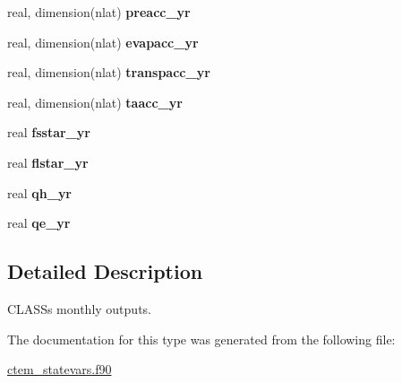 \begin{DoxyCompactItemize}
\item 
\hypertarget{structctem__statevars_1_1class__moyr__output_a426a91fcbee45b31d218c7f011e33e40}{}real, dimension(nlat) {\bfseries preacc\+\_\+yr}\label{structctem__statevars_1_1class__moyr__output_a426a91fcbee45b31d218c7f011e33e40}

\item 
\hypertarget{structctem__statevars_1_1class__moyr__output_aa49169490b0d581692a98c33a5bd30a2}{}real, dimension(nlat) {\bfseries evapacc\+\_\+yr}\label{structctem__statevars_1_1class__moyr__output_aa49169490b0d581692a98c33a5bd30a2}

\item 
\hypertarget{structctem__statevars_1_1class__moyr__output_a11a459fedcae713c3ef02f96f890aba6}{}real, dimension(nlat) {\bfseries transpacc\+\_\+yr}\label{structctem__statevars_1_1class__moyr__output_a11a459fedcae713c3ef02f96f890aba6}

\item 
\hypertarget{structctem__statevars_1_1class__moyr__output_afc23c698dded3c479a69cabd2fc35bf9}{}real, dimension(nlat) {\bfseries taacc\+\_\+yr}\label{structctem__statevars_1_1class__moyr__output_afc23c698dded3c479a69cabd2fc35bf9}

\item 
\hypertarget{structctem__statevars_1_1class__moyr__output_a61b7693efdd7d3aa645b143d9c98994e}{}real {\bfseries fsstar\+\_\+yr}\label{structctem__statevars_1_1class__moyr__output_a61b7693efdd7d3aa645b143d9c98994e}

\item 
\hypertarget{structctem__statevars_1_1class__moyr__output_a2c170085a3fee4ca9d79a13916077ee0}{}real {\bfseries flstar\+\_\+yr}\label{structctem__statevars_1_1class__moyr__output_a2c170085a3fee4ca9d79a13916077ee0}

\item 
\hypertarget{structctem__statevars_1_1class__moyr__output_af7c7ec3fb4d079015dc33d8e493e26f9}{}real {\bfseries qh\+\_\+yr}\label{structctem__statevars_1_1class__moyr__output_af7c7ec3fb4d079015dc33d8e493e26f9}

\item 
\hypertarget{structctem__statevars_1_1class__moyr__output_ac08485e4a8189fd2a36527285320372f}{}real {\bfseries qe\+\_\+yr}\label{structctem__statevars_1_1class__moyr__output_ac08485e4a8189fd2a36527285320372f}

\end{DoxyCompactItemize}


\subsection{Detailed Description}
C\+L\+A\+S\+S\textquotesingle{}s monthly outputs. 

The documentation for this type was generated from the following file\+:\begin{DoxyCompactItemize}
\item 
\hyperlink{ctem__statevars_8f90}{ctem\+\_\+statevars.\+f90}\end{DoxyCompactItemize}
